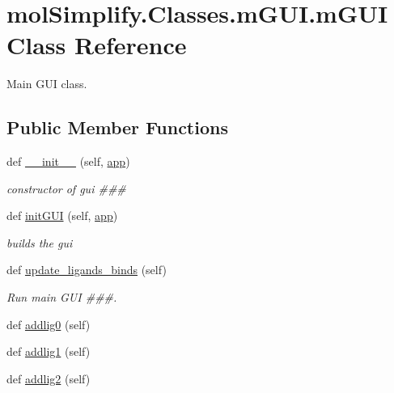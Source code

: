 \hypertarget{classmolSimplify_1_1Classes_1_1mGUI_1_1mGUI}{}\section{mol\+Simplify.\+Classes.\+m\+G\+U\+I.\+m\+G\+UI Class Reference}
\label{classmolSimplify_1_1Classes_1_1mGUI_1_1mGUI}


Main G\+UI class.  


\subsection*{Public Member Functions}
\begin{DoxyCompactItemize}
\item 
def \hyperlink{classmolSimplify_1_1Classes_1_1mGUI_1_1mGUI_a370a9d0abda56411694c37929ae576ab}{\+\_\+\+\_\+init\+\_\+\+\_\+} (self, \hyperlink{classmolSimplify_1_1Classes_1_1mGUI_1_1mGUI_a2602821a23fc89e4f1f815a9ea5d18b2}{app})
\begin{DoxyCompactList}\small\item\em constructor of gui \#\#\# \end{DoxyCompactList}\item 
def \hyperlink{classmolSimplify_1_1Classes_1_1mGUI_1_1mGUI_afcab86fbbe7237766d8ce0d36ffe0945}{init\+G\+UI} (self, \hyperlink{classmolSimplify_1_1Classes_1_1mGUI_1_1mGUI_a2602821a23fc89e4f1f815a9ea5d18b2}{app})
\begin{DoxyCompactList}\small\item\em builds the gui \end{DoxyCompactList}\item 
def \hyperlink{classmolSimplify_1_1Classes_1_1mGUI_1_1mGUI_a11b1e5ed39a08872863368749ae1aef2}{update\+\_\+ligands\+\_\+binds} (self)
\begin{DoxyCompactList}\small\item\em Run main G\+UI \#\#\#. \end{DoxyCompactList}\item 
def \hyperlink{classmolSimplify_1_1Classes_1_1mGUI_1_1mGUI_a53e2daef55b163f481c85f65558bb913}{addlig0} (self)
\item 
def \hyperlink{classmolSimplify_1_1Classes_1_1mGUI_1_1mGUI_af9184075a0a123f9cdcbae5c5241b6ae}{addlig1} (self)
\item 
def \hyperlink{classmolSimplify_1_1Classes_1_1mGUI_1_1mGUI_a44d70e4a014ac14f5bb79c27e67cb16f}{addlig2} (self)

\end{DoxyCompactItemize}
